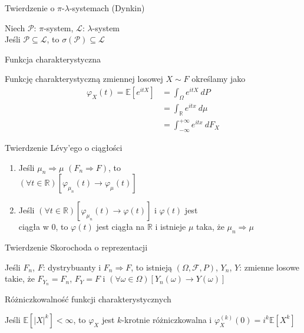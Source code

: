 \documentclass[avery5371,grid,frame]{flashcards}
\begin{document}
\begin{flashcard}[Twierdzenie]{Twierdzenie o $\pi$-$\lambda$-systemach (Dynkin)}

\smallskip
Niech $\mathcal{P}$: $\pi$-system, $\mathcal{L}$: $\lambda$-system \\
Jeśli $\mathcal{P} \subseteq \mathcal{L}$, to $\sigma(\mathcal{P}) \subseteq \mathcal{L}$
\end{flashcard}

\begin{flashcard}[Definicja]{Funkcja charakterystyczna}

\smallskip
Funkcję charakterystyczną zmiennej losowej $X \sim F$ określamy jako
{\begin{align*}
\varphi_X(t) = \mathbb{E} \left[ e^{itX} \right] &= \int_{\Omega} e^{itX} \ dP \\
             &= \int_{\mathbb{R}} e^{itx} \ d \mu \\
             &= \int_{-\infty}^{+\infty} e^{itx} \ dF_X 
\end{align*}}
\end{flashcard}

\begin{flashcard}[Twierdzenie]{Twierdzenie Lévy'ego o ciągłości}

\smallskip
\begin{enumerate}
\item Jeśli $\mu_n \Rightarrow \mu$ $(F_n \Rightarrow F)$, to \\ 
$(\forall t \in \mathbb{R})\left[\varphi_{\mu_n}(t) \rightarrow \varphi_\mu(t) \right]$
\item Jeśli $(\forall t \in \mathbb{R})\left[\varphi_{\mu_n}(t) \rightarrow \varphi(t) \right]$ i $\varphi(t)$ jest \\ ciągła w $0$, to $\varphi(t)$ jest ciągła na $\mathbb{R}$ i istnieje $\mu$ taka, że $\mu_n \Rightarrow \mu$
\end{enumerate}
\end{flashcard}

\begin{flashcard}[Twierdzenie]{Twierdzenie Skorochoda o reprezentacji}

\smallskip
Jeśli $F_n$, $F$: dystrybuanty i $F_n \Rightarrow F$, to istnieją $\left( \Omega, \mathcal{F}, P \right)$, $Y_n$, $Y$: zmienne losowe takie, że $F_{Y_n} = F_n$, $F_Y=F$ i $(\forall \omega \in \Omega)[Y_n(\omega) \rightarrow Y(\omega)]$
\end{flashcard}

\begin{flashcard}[Twierdzenie]{Różniczkowalność funkcji charakterystycznych}

\smallskip
Jeśli $\mathbb{E} \left[ |X|^k \right] < \infty$, to $\varphi_X$ jest $k$-krotnie różniczkowalna i $\varphi^{(k)}_X(0) = i^k \mathbb{E}[X^k]$
\end{flashcard}
\end{document}
